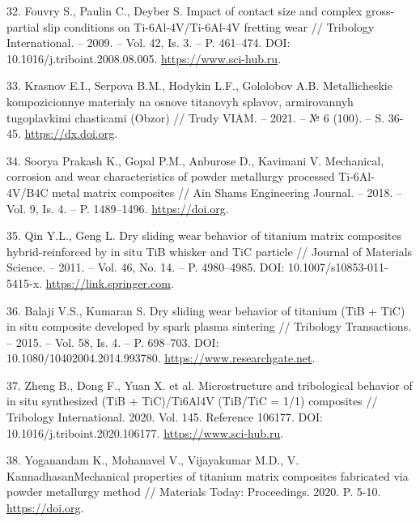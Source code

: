 \begin{references}
32. Fouvry S., Paulin C., Deyber S. Impact of contact size and complex
gross-partial slip conditions on Ti-6Al-4V/Ti-6Al-4V fretting wear //
Tribology International. – 2009. – Vol. 42, Is. 3. – P. 461–474. DOI:
10.1016/j.triboint.2008.08.005. \href{https://www.sci-hub.ru/10.1016/j.triboint.2008.08.005?ysclid=m87mkr00fc385128516}{https://www.sci-hub.ru}.

33. Krasnov E.I., Serpova B.M., Hodykin L.F., Gololobov
A.B. Metallicheskie kompozicionnye materialy na osnove titanovyh
splavov, armirovannyh tugoplavkimi chasticami (Obzor) // Trudy VIAM. –
2021. – № 6 (100). –
S. 36-45. \href{https://dx.doi.org/10.18577/2307-6046-2021-0-6-36-45}{https://dx.doi.org}.

34. Soorya Prakash K., Gopal P.M., Anburose D., Kavimani
V. Mechanical, corrosion and wear character\-istics of powder metallurgy
processed Ti-6Al-4V/B4C metal matrix composites // Ain Shams
Engineering Journal. – 2018. – Vol. 9, Is. 4. –
P. 1489–1496. \href{https://doi.org/10.1016/j.asej.2016.11.003}{https://doi.org}.

35. Qin Y.L., Geng L. Dry sliding wear behavior of titanium matrix
composites hybrid-reinforced by in situ TiB whisker and TiC particle
// Journal of Materials Science. – 2011. – Vol. 46, No. 14. –
P. 4980–4985. DOI:
10.1007/s10853-011-5415-x. \href{https://link.springer.com/article/10.1007/s10853-011-5415-x}{https://link.springer.com}.

36. Balaji V.S., Kumaran S. Dry sliding wear behavior of titanium (TiB
+ TiC) in situ composite developed by spark plasma sintering //
Tribology Transactions. – 2015. – Vol. 58, Is. 4. – P. 698–703. DOI:\\
10.1080/10402004.2014.993780. \href{https://www.researchgate.net/publication/276508350_Dry_Sliding_Wear_Behavior_of_Titanium-TiBTiC_in_situ_Composite_Developed_by_Spark_Plasma_Sintering}{https://www.researchgate.net}.

37. Zheng B., Dong F., Yuan X. et al. Microstructure and tribological
behavior of in situ synthesized (TiB + TiC)/Ti6Al4V (TiB/TiC = 1/1)
composites // Tribology International. 2020. Vol. 145. Reference
106177. DOI:
10.1016/j.triboint.2020.106177. \href{https://www.sci-hub.ru/10.1016/j.triboint.2020.106177?ysclid=m836h762qf658864232}{https://www.sci-hub.ru}.

38. Yoganandam K., Mohanavel V., Vijayakumar M.D.,
V. KannadhasanMechanical properties of titanium matrix composites
fabricated via powder metallurgy method // Materials Today:
Proceedings. 2020. P. 5-10. \href{https://doi.org/10.1016/j.matpr.2020.04.569}{https://doi.org}.


\end{references}
